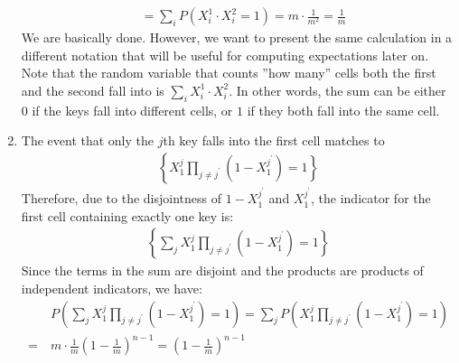\begin{example}
\begin{enumerate}
\begin{equation*}
\begin{split}
            &= \sum_{i}{P( X_{i}^1 \cdot X_{i}^{2} = 1)} = m\cdot \frac{1}{m^{2}} = \frac{1}{m}
          \end{split}
        \end{equation*} 
        We are basically done. However, we want to present the same calculation in a different notation that will be useful for computing expectations later on. Note that the random variable that counts ''how many'' cells both the first and the second fall into is $\sum_{i}{X_{i}^{1}\cdot X_{i}^{2} }$. In other words, the sum can be either $0$ if the keys fall into different cells, or $1$ if they both fall into the same cell.
      \item The event that only the $j$th key falls into the first cell matches to 
        \begin{equation*}
          \begin{split}
            \left\{ X_{1}^{j}\prod_{j\neq j^{\prime}}\left( 1 - X_{1}^{j^{\prime}} \right) = 1 \right\}
          \end{split}
        \end{equation*}
        Therefore, due to the disjointness of $1-X_{1}^{j^{\prime}}$ and $X_{1}^{j^{\prime}}$, the indicator for the first cell containing exactly one key is:
        \begin{equation*}
          \begin{split}
            \left\{ \sum_{j}{X_{1}^{j}\prod_{j\neq j^{\prime}}\left( 1 - X_{1}^{j^{\prime}} \right)} = 1  \right\}
          \end{split}
        \end{equation*} 
        Since the terms in the sum are disjoint and the products are products of independent indicators, we have:
        \begin{equation*}
          \begin{split}
            & P\left(\sum_{j}{X_{1}^{j}\prod_{j\neq j^{\prime}}\left( 1 - X_{1}^{j^{\prime}} \right)} = 1 \right) = \sum_{j}{ P\left( X_{1}^{j}\prod_{j\neq j^{\prime}}\left( 1 - X_{1}^{j^{\prime}} \right) = 1 \right)} \\
            = \ & m \cdot \frac{1}{m}\left( 1 - \frac{1}{m} \right)^{n-1} =  \left( 1 - \frac{1}{m} \right)^{n-1}
          \end{split}
        \end{equation*}
    \end{enumerate}
  \end{example}

